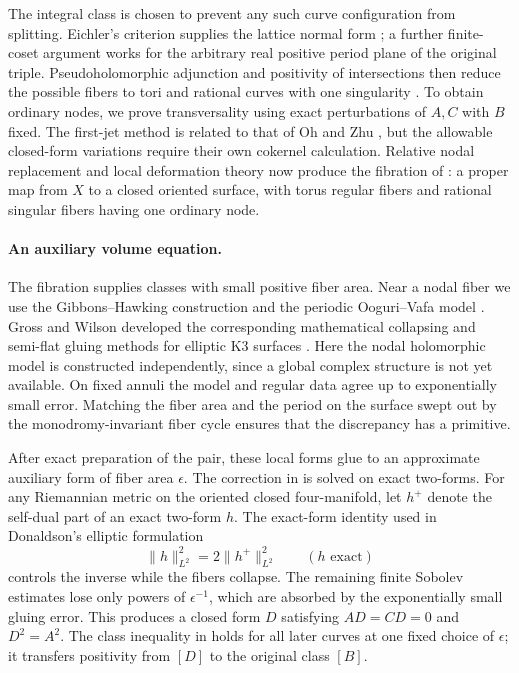 The integral class is chosen to prevent any such curve configuration
from splitting. Eichler's criterion supplies the lattice normal form
\cite[Proposition~3.3(i)]{GritsenkoHulekSankaran2009}; a further
finite-coset argument works for the arbitrary real positive period
plane of the original triple. Pseudoholomorphic adjunction and
positivity of intersections then reduce the possible fibers to tori
and rational curves with one singularity
\cite{McDuffSalamon2012,Wendl2020}.
To obtain ordinary nodes, we prove transversality using exact
perturbations of $A,C$ with $B$ fixed. The first-jet method is related
to that of Oh and Zhu \cite{OhZhu2008}, but the allowable closed-form
variations require their own cokernel calculation. Relative nodal
replacement and local deformation theory now produce the fibration
of : a proper map from $X$ to a closed oriented
surface, with torus regular fibers and rational singular fibers having
one ordinary node.

\paragraph{An auxiliary volume equation.}
The fibration supplies classes with small positive fiber area.
Near a nodal fiber we use the Gibbons--Hawking construction
\cite{GibbonsHawking1978} and the periodic Ooguri--Vafa model
\cite{OoguriVafa1996}. Gross and Wilson developed the corresponding
mathematical collapsing and semi-flat gluing methods for elliptic
K3 surfaces \cite{GrossWilson2000}. Here the nodal holomorphic model
is constructed independently, since a global complex structure is
not yet available. On fixed annuli the model and regular data agree
up to exponentially small error. Matching the fiber area and the
period on the surface swept out by the monodromy-invariant fiber
cycle ensures that the discrepancy has a primitive.

After exact preparation of the pair, these local forms glue to an
approximate auxiliary form of fiber area $\epsilon$.
The correction in  is solved on exact
two-forms. For any Riemannian metric on the oriented closed four-manifold, let
$h^+$ denote the self-dual part of an exact two-form $h$. The exact-form
identity used in Donaldson's elliptic formulation
\cite[Section~2, proof of Proposition~1; Section~4, Lemma~1]{Donaldson2006}
\[
 \|h\|_{L^2}^2=2\|h^+\|_{L^2}^2\qquad(h\text{ exact})
\]
controls the inverse while the fibers collapse. The remaining finite
Sobolev estimates lose only powers of $\epsilon^{-1}$, which are
absorbed by the exponentially small gluing error. This produces a
closed form $D$ satisfying $AD=CD=0$ and $D^2=A^2$.
The class inequality in  holds for all
later curves at one fixed choice of $\epsilon$; it transfers
positivity from $[D]$ to the original class $[B]$.

